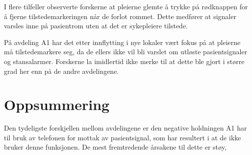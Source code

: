\noindent
I flere tilfeller observerte forskerne at pleierne glemte å trykke på rødknappen for å fjerne tilstedemarkeringen når de forlot rommet. Dette medfører at signaler varsles inne på pasientrom uten at det er sykepleiere tilstede.

\noindent
På avdeling A1 har det etter innflytting i nye lokaler vært fokus på at pleierne må tilstedemarkere seg, da de ellers ikke vil bli varslet om utløste pasientsignaler og stansalarmer. Forskerne la imidlertid ikke merke til at dette ble gjort i større grad her enn på de andre avdelingene.  

\section{Oppsummering}
Den tydeligste forskjellen mellom avdelingene er den negative holdningen A1 har til bruk av telefonen for mottak av pasientsignal, som har resultert i at de ikke bruker denne funksjonen. De mest fremtredende årsakene til dette er støy, 











